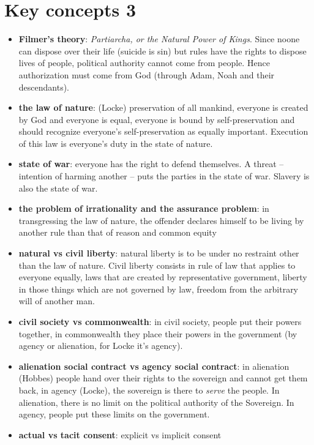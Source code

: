 \section{Key concepts 3}

\begin{itemize}
	\item \textbf{Filmer’s theory}: \textit{Partiarcha, or the Natural
	 Power of Kings}. Since noone can dispose over their life (suicide is
	 sin) but rules have the rights to dispose lives of people, political
	 authority cannot come from people. Hence authorization must come from
	 God (through Adam, Noah and their descendants).
	\item \textbf{the law of nature}: (Locke) preservation of all mankind,
	 everyone is created by God and everyone is equal, everyone is bound
	 by self-preservation and should recognize everyone's self-preservation
	 as equally important. Execution of this law is everyone's duty in the
	 state of nature.
	\item \textbf{state of war}: everyone has the right to defend
	 themselves. A threat -- intention of harming another -- puts the
	 parties in the state of war. Slavery is also the state of war.
	\item \textbf{the problem of irrationality and the assurance problem}:
	 in transgressing the law of nature, the offender declares himself to
	 be living by another rule than that of reason and common equity
	\item \textbf{natural vs civil liberty}: natural liberty is to be under
	 no restraint other than the law of nature. Civil liberty consists in
	 rule of law that applies to everyone equally, laws that are created by
	 representative government, liberty in those things which are not
	 governed by law, freedom from the arbitrary will of another man.
	\item \textbf{civil society vs commonwealth}: in civil society, people
	 put their powers together, in commonwealth they place their powers in
	 the government (by agency or alienation, for Locke it's agency).
	\item \textbf{alienation social contract vs agency social contract}:
	 in alienation (Hobbes) people hand over their rights to the sovereign
	 and cannot get them back, in agency (Locke), the sovereign is there to
	 \textit{serve} the people. In alienation, there is no limit on the
	 political authority of the Sovereign. In agency, people put these
	 limits on the government.
	\item \textbf{actual vs tacit consent}: explicit vs implicit consent

\end{itemize}
